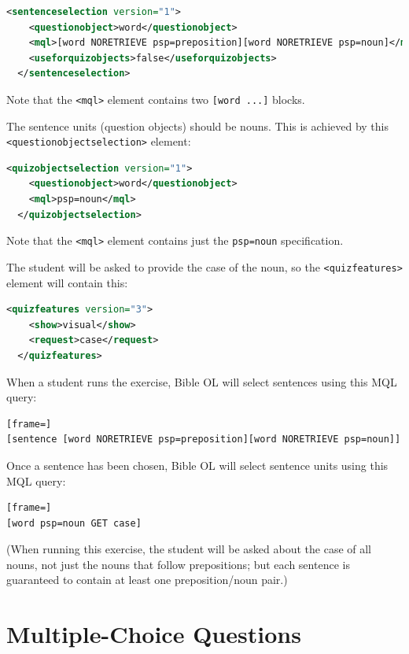 \documentclass[11pt,oneside,a4paper]{memoir}
\newcommand*{\xml}[1]{\texttt{<#1>}}
\begin{document}
\begin{lstlisting}[language=XML]
  <sentenceselection version="1">
    <questionobject>word</questionobject>
    <mql>[word NORETRIEVE psp=preposition][word NORETRIEVE psp=noun]</mql>
    <useforquizobjects>false</useforquizobjects>
  </sentenceselection>
\end{lstlisting}

Note that the \xml{mql} element contains two \texttt{[word~...]} blocks.


The sentence units (question objects) should be nouns. This is achieved
by this \xml{question\-object\-selection} element:

\begin{lstlisting}[language=XML]
  <quizobjectselection version="1">
    <questionobject>word</questionobject>
    <mql>psp=noun</mql>
  </quizobjectselection>
\end{lstlisting}

Note that the \xml{mql} element contains just the \texttt{psp=noun} specification.

The student will be asked to provide the case of the noun, so the \xml{quizfeatures} element will
contain this:


\begin{lstlisting}[language=XML]
  <quizfeatures version="3">
    <show>visual</show>
    <request>case</request>
  </quizfeatures>
\end{lstlisting}


When a student runs the exercise, Bible OL will select sentences using this MQL query:

\begin{lstlisting}[frame=]
[sentence [word NORETRIEVE psp=preposition][word NORETRIEVE psp=noun]]
\end{lstlisting}

Once a sentence has been chosen, Bible OL will select sentence units using this MQL query:

\begin{lstlisting}[frame=]
[word psp=noun GET case]
\end{lstlisting}

(When running this exercise, the student will be asked about the case of all nouns, not just the
nouns that follow prepositions; but each sentence is guaranteed to contain at least one
preposition/noun pair.)

\chapter{Multiple-Choice Questions}\label{chap-multiple-choice}
\end{document}
